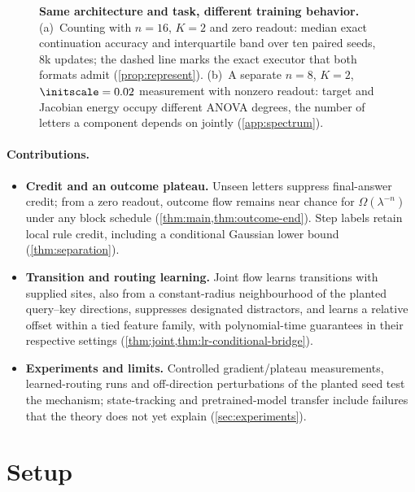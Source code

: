 \begin{figure}[t]
\centering

\caption{\textbf{Same architecture and task, different training behavior.}
(a)~Counting with $n=16$, $K=2$ and zero readout: median exact continuation accuracy and interquartile band over ten paired seeds, $8$k
updates; the dashed line marks the exact executor that both formats admit (\cref{prop:represent}).
(b)~A separate $n=8$, $K=2$, $\initscale=0.02$ measurement with nonzero readout: target and Jacobian energy occupy different ANOVA degrees, the number of letters a component depends on jointly (\cref{app:spectrum}).}
\label{fig:overview}
\end{figure}

\paragraph{Contributions.}
\begin{itemize}[leftmargin=*,itemsep=2pt,topsep=2pt]
\item \textbf{Credit and an outcome plateau.} Unseen letters suppress final-answer credit;
from a zero readout, outcome flow remains near chance for $\Omega(\lambda^{-n})$
under any block schedule (\cref{thm:main,thm:outcome-end}). Step labels retain local rule
credit, including a conditional Gaussian lower bound (\cref{thm:separation}).
\item \textbf{Transition and routing learning.} Joint flow learns transitions with supplied
sites, also from a constant-radius neighbourhood of the planted query--key directions, suppresses designated distractors, and learns a relative offset within a tied
feature family, with polynomial-time guarantees in their respective settings
(\cref{thm:joint,thm:lr-conditional-bridge}).
\item \textbf{Experiments and limits.} Controlled gradient/plateau measurements, learned-routing
runs and off-direction perturbations of the planted seed test the mechanism; state-tracking and pretrained-model transfer include failures
that the theory does not yet explain (\cref{sec:experiments}).
\end{itemize}

\section{Setup}
\label{sec:setup}
\label{sec:setting}

